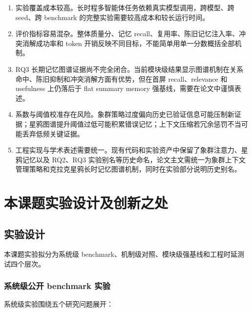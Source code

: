 \documentclass[UTF8,a4paper,zihao=-4,fontset=windows]{ctexart}
\begin{document}
\begin{enumerate}[label=\arabic*.]
  \item 实验覆盖成本较高。长时程多智能体任务依赖真实模型调用，跨模型、跨 seed、跨 benchmark 的完整实验需要较高成本和较长运行时间。
  \item 评价指标容易混杂。整体质量分、记忆 recall、复用率、陈旧记忆注入率、冲突消解成功率和 token 开销反映不同目标，不能简单用单一分数概括全部机制。
  \item RQ3 长期记忆图谱证据尚不完全闭合。当前模块级结果显示图谱机制在关系命中、陈旧抑制和冲突消解方面有优势，但在首屏 recall、relevance 和 usefulness 上仍落后于 flat summary memory 强基线，需要在论文中谨慎表述。
  \item 系数与阈值校准存在风险。象群策略过度偏向历史已验证信息可能压制新证据；星鸦图谱提升阈值过低可能积累错误记忆；上下文压缩若冗余惩罚不当可能丢弃低频关键证据。
  \item 工程实现与学术表述需要统一。现有代码和实验资产中保留了象群注意力、星鸦记忆以及 RQ2、RQ3 实验别名等历史命名，论文主文需统一为象群上下文管理策略和克拉克星鸦长时记忆图谱机制，同时在实验部分说明历史别名。
\end{enumerate}

\section{本课题实验设计及创新之处}

\subsection{实验设计}

本课题实验拟分为系统级 benchmark、机制级对照、模块级强基线和工程时延测试四个层次。

\subsubsection{系统级公开 benchmark 实验}

系统级实验围绕五个研究问题展开：
\end{document}
